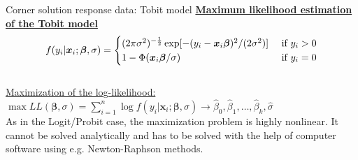 \documentclass[usenames,dvipsnames]{beamer}
\newcommand{\mytikzmark}[2]{%
  \tikz[remember picture,inner sep=0pt,outer sep=0pt,baseline,anchor=base] 
    \node (#1) {\ensuremath{#2}};}
\begin{document}
\begin{frame}{Corner solution response data: Tobit model}
\underline{\textbf{Maximum likelihood estimation of the Tobit model}}
\begin{align*}
f(y_i|\bm{x}_i; \bm{\beta}, \sigma) = 
  \begin{cases}
   \mytikzmark{A}{(2 \pi \sigma^2)^{-\frac{1}{2}} \exp[-(y_i - \bm{x}_i \bm{\beta})^2 / (2 \sigma^2)]} & \ \text{if } y_i > 0 \\
  \mytikzmark{B}{1 - \Phi(\bm{x}_i \bm{\beta} / \sigma)}  & \ \text{if } y_i = 0 \\
  \end{cases}
\end{align*} \\
\vspace*{1.4cm}
\underline{Maximization of the log-likelihood:} \\
\medskip
$\max LL(\bm{\beta}, \sigma) = \sum \limits_{i=1}^{n} \log f(y_i|\bm{x}_i; \bm{\beta}, \sigma) \to \hat{\beta}_0, \hat{\beta}_1, \dots, \hat{\beta}_k, \hat{\sigma}$ \\
\medskip
{\footnotesize
As in the Logit/Probit case, the maximization problem is highly nonlinear. It cannot be solved analytically and has to be solved with the help of computer software using e.g. Newton-Raphson methods.}
\end{frame}
\end{document}
